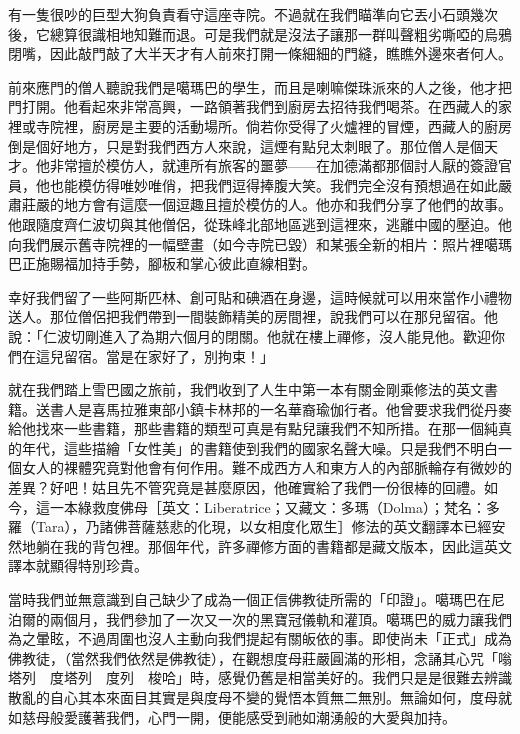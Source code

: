 有一隻很吵的巨型大狗負責看守這座寺院。不過就在我們瞄準向它丟小石頭幾次後，它總算很識相地知難而退。可是我們就是沒法子讓那一群叫聲粗劣嘶啞的烏鴉閉嘴，因此敲門敲了大半天才有人前來打開一條細細的門縫，瞧瞧外邊來者何人。

前來應門的僧人聽說我們是噶瑪巴的學生，而且是喇嘛傑珠派來的人之後，他才把門打開。他看起來非常高興，一路領著我們到廚房去招待我們喝茶。在西藏人的家裡或寺院裡，廚房是主要的活動場所。倘若你受得了火爐裡的冒煙，西藏人的廚房倒是個好地方，只是對我們西方人來說，這煙有點兒太刺眼了。那位僧人是個天才。他非常擅於模仿人，就連所有旅客的噩夢——在加德滿都那個討人厭的簽證官員，他也能模仿得唯妙唯俏，把我們逗得捧腹大笑。我們完全沒有預想過在如此嚴肅莊嚴的地方會有這麼一個逗趣且擅於模仿的人。他亦和我們分享了他們的故事。他跟隨度齊仁波切與其他僧侶，從珠峰北部地區逃到這裡來，逃離中國的壓迫。他向我們展示舊寺院裡的一幅壁畫（如今寺院已毀）和某張全新的相片：照片裡噶瑪巴正施賜福加持手勢，腳板和掌心彼此直線相對。

幸好我們留了一些阿斯匹林、創可貼和碘酒在身邊，這時候就可以用來當作小禮物送人。那位僧侶把我們帶到一間裝飾精美的房間裡，說我們可以在那兒留宿。他說：「仁波切剛進入了為期六個月的閉關。他就在樓上禪修，沒人能見他。歡迎你們在這兒留宿。當是在家好了，別拘束！」

就在我們踏上雪巴國之旅前，我們收到了人生中第一本有關金剛乘修法的英文書籍。送書人是喜馬拉雅東部小鎮卡林邦的一名華裔瑜伽行者。他曾要求我們從丹麥給他找來一些書籍，那些書籍的類型可真是有點兒讓我們不知所措。在那一個純真的年代，這些描繪「女性美」的書籍使到我們的國家名聲大噪。只是我們不明白一個女人的裸體究竟對他會有何作用。難不成西方人和東方人的內部脈輪存有微妙的差異？好吧！姑且先不管究竟是甚麼原因，他確實給了我們一份很棒的回禮。如今，這一本綠救度佛母［英文：Liberatrice；又藏文：多瑪（Dolma）；梵名：多羅（Tara），乃諸佛菩薩慈悲的化現，以女相度化眾生］修法的英文翻譯本已經安然地躺在我的背包裡。那個年代，許多禪修方面的書籍都是藏文版本，因此這英文譯本就顯得特別珍貴。

當時我們並無意識到自己缺少了成為一個正信佛教徒所需的「印證」。噶瑪巴在尼泊爾的兩個月，我們參加了一次又一次的黑寶冠儀軌和灌頂。噶瑪巴的威力讓我們為之暈眩，不過周圍也沒人主動向我們提起有關皈依的事。即使尚未「正式」成為佛教徒，（當然我們依然是佛教徒），在觀想度母莊嚴圓滿的形相，念誦其心咒「嗡　塔列　度塔列　度列　梭哈」時，感覺仍舊是相當美好的。我們只是是很難去辨識散亂的自心其本來面目其實是與度母不變的覺悟本質無二無別。無論如何，度母就如慈母般愛護著我們，心門一開，便能感受到祂如潮湧般的大愛與加持。

